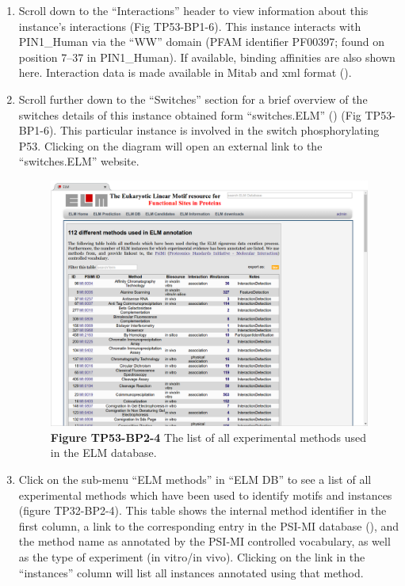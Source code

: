 \begin{enumerate}
\item Scroll down to the ``Interactions'' header to view information about this
	instance's interactions (Fig TP53-BP1-6). This instance interacts with
	PIN1\_Human via the ``WW'' domain (PFAM identifier PF00397; found on
	position 7--37 in PIN1\_Human). If available, binding affinities are
	also shown here. Interaction data is made available in Mitab and xml
	format (\cite{17925023}).  

\item Scroll further down to the ``Switches'' section for a brief overview of
	the switches details of this instance obtained form ``switches.ELM''
	(\cite{23550212}) (Fig TP53-BP1-6). This particular instance is
	involved in the switch phosphorylating P53. Clicking on the diagram
	will open an external link to the ``switches.ELM'' website.

\begin{figure}[h!]
	\centering
	\includegraphics[width=\textwidth]{Figures/explore_content/methods.png} 
	\caption{
	\textbf{Figure TP53-BP2-4}
	The list of all experimental methods used in the ELM database.
	}
	\label{fig:explore_content_methods}
\end{figure}

\item Click on the sub-menu ``ELM methods'' in ``ELM DB'' to see a list of all
	experimental methods which have been used to identify motifs and
	instances (figure TP32-BP2-4). This table shows the internal method
	identifier in the first column, a link to the corresponding entry in
	the PSI-MI database (\cite{17925023}), and the method name as annotated
	by the PSI-MI controlled vocabulary, as well as the type of experiment
	(in vitro/in vivo). Clicking on the link in the ``instances'' column
	will list all instances annotated using that method.  


\end{enumerate}
